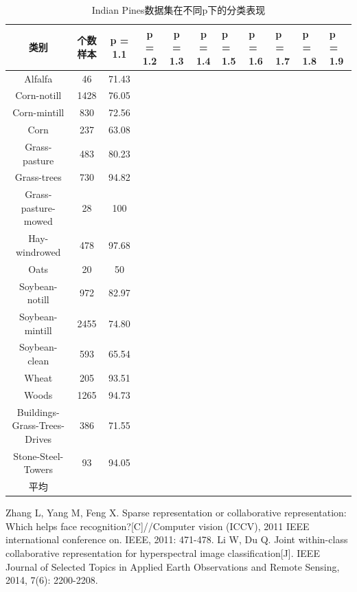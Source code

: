 \documentclass[12pt,a4paper]{article}
\begin{document}
\begin{table}[h]
\centering
\caption{Indian Pines数据集在不同p下的分类表现}\label{tab:Ind_diff_p}
\begin{tabu} to 1\textwidth{cccccc}
\hline
类别 & 个数样本 & p = 1.1 & p = 1.2 & p = 1.3 & p = 1.4 & p = 1.5 & p = 1.6 & p = 1.7 & p = 1.8 & p = 1.9\\
\hline
Alfalfa & 46 & 71.43 \\
Corn-notill & 1428 & 76.05\\
Corn-mintill & 830 & 72.56\\
Corn & 237 & 63.08\\
Grass-pasture & 483 & 80.23\\
Grass-trees & 730 & 94.82\\
Grass-pasture-mowed & 28 & 100\\
Hay-windrowed & 478 & 97.68\\
Oats & 20 & 50\\
Soybean-notill & 972 & 82.97\\
Soybean-mintill & 2455 & 74.80\\
Soybean-clean & 593 & 65.54\\
Wheat & 205 & 93.51\\
Woods & 1265 & 94.73\\
Buildings-Grass-Trees-Drives & 386 & 71.55\\
Stone-Steel-Towers & 93 & 94.05\\
\hline
平均 & 
\hline
\end{tabu}
\end{table}



\begin{thebibliography}{}
 Zhang L, Yang M, Feng X. Sparse representation or collaborative representation: Which helps face recognition?[C]//Computer vision (ICCV), 2011 IEEE international conference on. IEEE, 2011: 471-478.
Li W, Du Q. Joint within-class collaborative representation for hyperspectral image classification[J]. IEEE Journal of Selected Topics in Applied Earth Observations and Remote Sensing, 2014, 7(6): 2200-2208.
\end{thebibliography}
\clearpage
\end{document}

